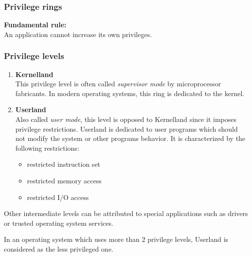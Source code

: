 %
%
%

\begin{frame}
  \frametitle{Privilege rings}

  \begin{center}
  \end{center}

  \-

  {\bf Fundamental rule:}\\
  An application cannot increase its own privileges.

\end{frame}

%
%
%

\begin{frame}
  \frametitle{Privilege levels}

  \begin{enumerate}
  \item {\bf Kernelland}\\
    This privilege level is often called {\em supervisor mode} by microprocessor
    fabricants. In modern operating systems, this ring is dedicated to the kernel.

    \-

  \item {\bf Userland}\\
    Also called {\em user mode}, this level is opposed to Kernelland since it
    imposes privilege restrictions. Userland is dedicated to user programs
    which should not modify the system or other programs behavior. It is
    characterized by the following restrictions:

    \begin{itemize}
      \item restricted instruction set
      \item restricted memory access
      \item restricted I/O access
    \end{itemize}
  \end{enumerate}

  \-

  Other intermediate levels can be attributed to special applications such as
  drivers or trusted operating system services.

  \-

  In an operating system which uses more than 2 privilege levels, Userland is
  considered as the less privileged one.

\end{frame}

